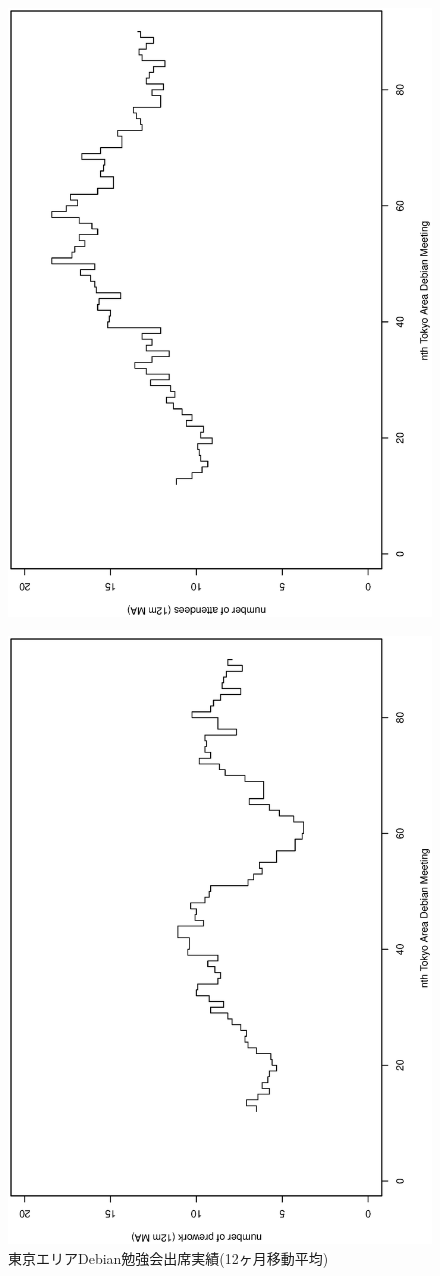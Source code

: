 \documentclass[mingoth,a4paper]{jsarticle}
\begin{document}
\begin{figure}[htbp]
 \begin{minipage}{0.5\hsize}
  \begin{center}
 \includegraphics[width=0.7\hsize,angle=270]{image201212/memberanalysis/attend.eps}
  \end{center}
\caption{東京エリアDebian勉強会出席実績(12ヶ月移動平均)}\label{fig:tokyoattend2012}
  \label{fig:one}
 \end{minipage}
 \begin{minipage}{0.5\hsize}
  \begin{center}
 \includegraphics[width=0.7\hsize,angle=270]{image201212/memberanalysis/prework.eps}  \end{center}

\end{minipage}
\end{figure}
\end{document}

